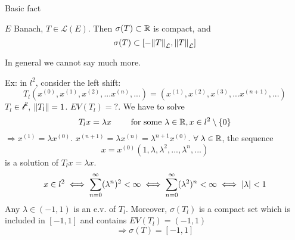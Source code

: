 Basic fact
\begin{theorem}
    \(E\) Banach, \(T \in \mathcal{L}(E)\). Then \(\sigma(T) \subset \mathbb{R}\) is compact, and 
    \[
        \sigma(T) \subset \left[ - \norm{T}_\mathcal{L}, \norm{T}_\mathcal{L} \right]
    \]
\end{theorem}

In general we cannot say much more.

Ex: in \(l^2\), consider the left shift:
\[
    T_l(x^{(0)}, x^{(1)}, x^{(2)},... x^{(n)},...) = (x^{(1)}, x^{(2)}, x^{(3)},... x^{(n+1)},...)
\]
\(T_l \in \mathcal{l^2}\), \(\norm{T_l}=1\). \(EV(T_l)=?\). We have to solve
\[
    T_l x = \lambda x \qquad \text{ for some } \lambda \in \mathbb{R}, x \in l^2 \setminus \{0\}
\]
\(\Rightarrow x^{(1)}=\lambda x^{(0)}\). \(x^{(n+1)} = \lambda x^{(n)} = \lambda^{n+1} x^{(0)}\). \(\forall \; \lambda \in \mathbb{R}\), the sequence
\[
    x = x^{(0)} \left(1, \lambda,\lambda^2, ..., \lambda^n, ...\right)
\]
is a solution of \(T_l x = \lambda x\).
\[
    x \in l^2 \iff \sum_{n=0}^\infty (\lambda^n)^2 < \infty \iff \sum_{n=0}^\infty (\lambda^2)^n < \infty \iff \abs{\lambda} < 1
\]
Any \(\lambda \in (-1, 1)\) is an e.v. of \(T_l\). Moreover, \(\sigma(T_l)\) is a compact set which is included in \([-1, 1]\) and contains \(EV(T_l) =(-1, 1)\)
\[
    \Rightarrow \sigma(T) = [-1, 1]
\]
